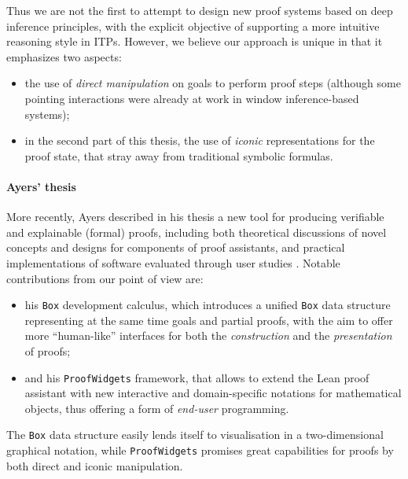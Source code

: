 Thus we are not the first to attempt to design new proof systems based on deep
inference principles, with the explicit objective of supporting a more intuitive
reasoning style in ITPs. However, we believe our approach is
unique in that it emphasizes two aspects:
\begin{itemize}
  \item the use of \emph{direct manipulation} on goals to perform proof steps
  (although some pointing interactions were already at work in window
  inference-based systems);
  \item in the second part of this thesis, the use of \emph{iconic}
  representations for the proof state, that stray away from traditional symbolic
  formulas.
\end{itemize}

\paragraph{Ayers' thesis}

More recently, Ayers described in his thesis a new tool for producing verifiable
and explainable (formal) proofs, including both theoretical discussions of novel
concepts and designs for components of proof assistants, and practical
implementations of software evaluated through user studies
. Notable contributions from our point of view are:
\begin{itemize}
  \item his \texttt{Box} development calculus, which introduces a unified
\texttt{Box} data structure representing at the same time goals and partial
proofs, with the aim to offer more ``human-like'' interfaces for both the
\emph{construction} and the \emph{presentation} of proofs;
  \item and his \texttt{ProofWidgets} framework, that allows to extend the Lean
proof assistant with new interactive and domain-specific notations for
mathematical objects, thus offering a form of \emph{end-user} programming.
\end{itemize}
The \texttt{Box} data structure easily lends itself to visualisation in a
two-dimensional graphical notation, while \texttt{ProofWidgets} promises great
capabilities for proofs by both direct and iconic manipulation.


